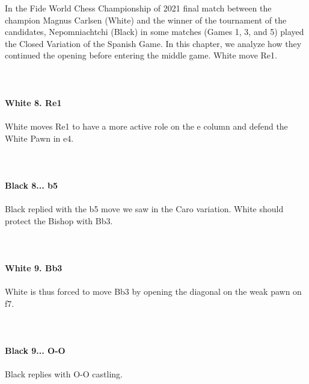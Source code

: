 \documentclass{article}
\begin{document}
In the Fide World Chess Championship of 2021 final match between the champion Magnus Carlsen (White) and the winner of the tournament of the candidates, Nepomniachtchi (Black) in some matches (Games 1, 3, and 5) played the Closed Variation of the Spanish Game. In this chapter, we analyze how they continued the opening before entering the middle game. White move Re1.\\
\\

\\
\\
\textbf{White 8. Re1}\\
\\
White moves Re1 to have a more active role on the e column and defend the White Pawn in e4.\\
\\

\\
\\
\textbf{Black 8... b5}\\
\\
Black replied with the b5 move we saw in the Caro variation. White should protect the Bishop with Bb3.\\
\\

\\
\\
\textbf{White 9. Bb3}\\
\\
White is thus forced to move Bb3 by opening the diagonal on the weak pawn on f7.\\
\\

\\
\\
\textbf{Black 9... O-O}\\
\\
Black replies with O-O castling.\\
\\
\end{document}
